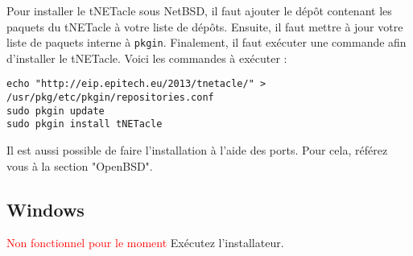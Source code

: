 Pour installer le tNETacle sous NetBSD, il faut ajouter le dépôt
contenant les paquets du tNETacle à votre liste de dépôts.
Ensuite, il faut mettre à jour votre liste de paquets interne à \texttt{pkgin}.
Finalement, il faut exécuter une commande afin d'installer le tNETacle.
Voici les commandes à exécuter :

\begin{lstlisting}
echo "http://eip.epitech.eu/2013/tnetacle/" > /usr/pkg/etc/pkgin/repositories.conf
sudo pkgin update
sudo pkgin install tNETacle
\end{lstlisting}

Il est aussi possible de faire l'installation à l'aide des ports.
Pour cela, référez vous à la section "OpenBSD".

\subsection{Windows}
\textcolor{red}{Non fonctionnel pour le moment}
Exécutez l'installateur.
